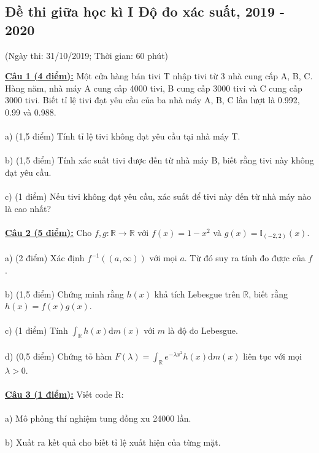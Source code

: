 \documentclass[10pt, a4paper]{article}
\begin{document}
\newpage

\subsection{Đề thi giữa học kì I Độ đo xác suất, 2019 - 2020}
\begin{center}
	\color{blue}(Ngày thi: 31/10/2019; Thời gian: 60 phút)
\end{center}
\color{red}\underline{\textbf{Câu 1 (4 điểm):}} \color{black}Một cửa hàng bán tivi T nhập tivi từ 3 nhà cung cấp A, B, C. Hàng năm, nhà máy A cung cấp 4000 tivi, B cung cấp 3000 tivi và C cung cấp 3000 tivi. Biết tỉ lệ tivi đạt yêu cầu của ba nhà máy A, B, C lần lượt là 0.992, 0.99 và 0.988.\\\\
\color{red}a) (1,5 điểm) \color{black}Tính tỉ lệ tivi không đạt yêu cầu tại nhà máy T.\\\\
\color{red}b) (1,5 điểm) \color{black}Tính xác suất tivi được đến từ nhà máy B, biết rằng tivi này không đạt yêu cầu.\\\\
\color{red}c) (1 điểm) \color{black}Nếu tivi không đạt yêu cầu, xác suất để tivi này đến từ nhà máy nào là cao nhất?\\\\
\color{red}\underline{\textbf{Câu 2 (5 điểm):}} \color{black}Cho $f,g:\mathbb R\rightarrow\mathbb R$ với $f(x)=1-x^2$ và $g(x)=\mathbb I_{(-2,2)}(x)$.\\\\
\color{red}a) (2 điểm) \color{black}Xác định $f^{-1}((a,\infty))$ với mọi $a$. Từ đó suy ra tính đo được của $f$.\\\\
\color{red}b) (1,5 điểm) \color{black}Chứng minh rằng $h(x)$ khả tích Lebesgue trên $\mathbb R$, biết rằng $h(x)=f(x)g(x)$.\\\\
\color{red}c) (1 điểm) \color{black}Tính $\displaystyle\int_{\mathbb R}h(x)\text{d}m(x)$ với $m$ là độ đo Lebesgue.\\\\
\color{red}d) (0,5 điểm) \color{black}Chứng tỏ hàm $F(\lambda)=\displaystyle\int_{\mathbb R}e^{-\lambda x^2}h(x)\text{d}m(x)$ liên tục với mọi $\lambda>0$.\\\\
\color{red}\underline{\textbf{Câu 3 (1 điểm):}} \color{black}Viết code R:\\\\
\color{red}a) \color{black}Mô phỏng thí nghiệm tung đồng xu 24000 lần.\\\\
\color{red}b) \color{black}Xuất ra kết quả cho biết tỉ lệ xuất hiện của từng mặt.
\end{document}
